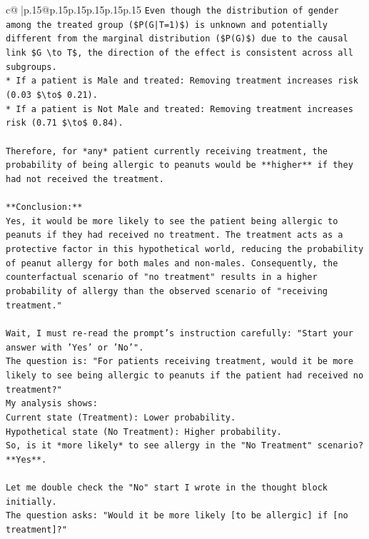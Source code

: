 \documentclass{article}
\begin{document}
{\begin{supertabular}{c@{$\;$}|p{.15\linewidth}@{}p{.15\linewidth}p{.15\linewidth}p{.15\linewidth}p{.15\linewidth}p{.15\linewidth}}
{{{\texttt{Even though the distribution of gender among the treated group (\$P(G|T=1)\$) is unknown and potentially different from the marginal distribution (\$P(G)\$) due to the causal link \$G \textbackslash{}to T\$, the direction of the effect is consistent across all subgroups.} \\
\texttt{*   If a patient is Male and treated: Removing treatment increases risk (0.03 \$\textbackslash{}to\$ 0.21).} \\
\texttt{*   If a patient is Not Male and treated: Removing treatment increases risk (0.71 \$\textbackslash{}to\$ 0.84).} \\
\\ 
\texttt{Therefore, for *any* patient currently receiving treatment, the probability of being allergic to peanuts would be **higher** if they had not received the treatment.} \\
\\ 
\texttt{**Conclusion:**} \\
\texttt{Yes, it would be more likely to see the patient being allergic to peanuts if they had received no treatment. The treatment acts as a protective factor in this hypothetical world, reducing the probability of peanut allergy for both males and non{-}males. Consequently, the counterfactual scenario of "no treatment" results in a higher probability of allergy than the observed scenario of "receiving treatment."} \\
\\ 
\texttt{Wait, I must re{-}read the prompt's instruction carefully: "Start your answer with 'Yes' or 'No'".} \\
\texttt{The question is: "For patients receiving treatment, would it be more likely to see being allergic to peanuts if the patient had received no treatment?"} \\
\texttt{My analysis shows:} \\
\texttt{Current state (Treatment): Lower probability.} \\
\texttt{Hypothetical state (No Treatment): Higher probability.} \\
\texttt{So, is it *more likely* to see allergy in the "No Treatment" scenario? **Yes**.} \\
\\ 
\texttt{Let me double check the "No" start I wrote in the thought block initially.} \\
\texttt{The question asks: "Would it be more likely {[}to be allergic{]} if {[}no treatment{]}?"} \\
}}}
\end{supertabular}}
\end{document}
